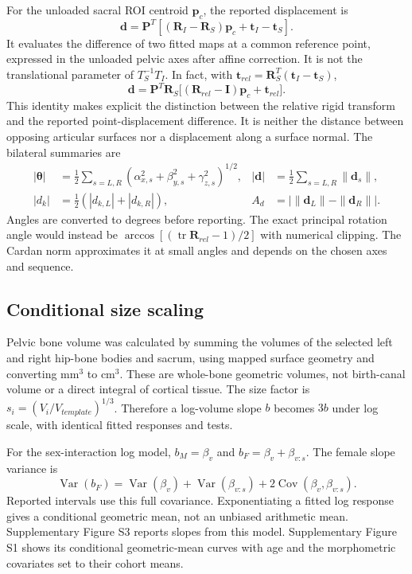 For the unloaded sacral ROI centroid $\mathbf p_c$, the reported displacement is
\begin{equation}
\mathbf d=\mathbf P^T[(\mathbf R_I-\mathbf R_S)\mathbf p_c+\mathbf t_I-\mathbf t_S].
\end{equation}
It evaluates the difference of two fitted maps at a common reference point, expressed in the unloaded pelvic axes after affine correction. It is not the translational parameter of $T_S^{-1}T_I$. In fact, with $\mathbf t_{rel}=\mathbf R_S^T(\mathbf t_I-\mathbf t_S)$,
\begin{equation}
\mathbf d=\mathbf P^T\mathbf R_S\big[(\mathbf R_{rel}-\mathbf I)\mathbf p_c+\mathbf t_{rel}\big].
\end{equation}
This identity makes explicit the distinction between the relative rigid transform and the reported point-displacement difference. It is neither the distance between opposing articular surfaces nor a displacement along a surface normal. The bilateral summaries are
\begin{align}
|\boldsymbol\theta|&=\tfrac12\sum_{s=L,R}(\alpha_{x,s}^2+\beta_{y,s}^2+\gamma_{z,s}^2)^{1/2}, &
|\mathbf d|&=\tfrac12\sum_{s=L,R}\|\mathbf d_s\|,\\
|d_k|&=\tfrac12(|d_{k,L}|+|d_{k,R}|), &
A_d&=\big|\|\mathbf d_L\|-\|\mathbf d_R\|\big|.
\end{align}
Angles are converted to degrees before reporting. The exact principal rotation angle would instead be $\arccos[(\operatorname{tr}\mathbf R_{rel}-1)/2]$ with numerical clipping. The Cardan norm approximates it at small angles and depends on the chosen axes and sequence.

\subsection{Conditional size scaling}
Pelvic bone volume was calculated by summing the volumes of the selected left and right hip-bone bodies and sacrum, using mapped surface geometry and converting mm$^3$ to cm$^3$. These are whole-bone geometric volumes, not birth-canal volume or a direct integral of cortical tissue. The size factor is $s_i=(V_i/V_{template})^{1/3}$. Therefore a log-volume slope $b$ becomes $3b$ under log scale, with identical fitted responses and tests.

For the sex-interaction log model, $b_M=\beta_v$ and $b_F=\beta_v+\beta_{v:s}$. The female slope variance is
\begin{equation}
\operatorname{Var}(b_F)=\operatorname{Var}(\beta_v)+\operatorname{Var}(\beta_{v:s})+2\operatorname{Cov}(\beta_v,\beta_{v:s}).
\end{equation}
Reported intervals use this full covariance. Exponentiating a fitted log response gives a conditional geometric mean, not an unbiased arithmetic mean. Supplementary Figure S3 reports slopes from this model. Supplementary Figure S1 shows its conditional geometric-mean curves with age and the morphometric covariates set to their cohort means.

